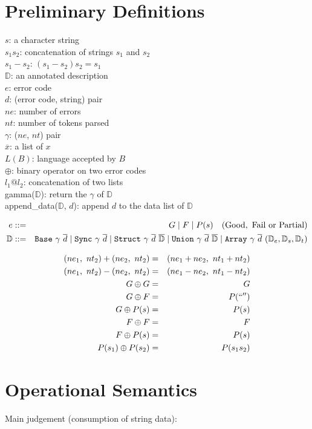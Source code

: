 \documentclass[11pt]{article}
\renewcommand{\bar}[1]{\overline #1}
\newcommand{\base}{{\tt Base}}
\newcommand{\sync}{{\tt Sync}}
\newcommand{\mystruct}{{\tt Struct}}
\newcommand{\myunion}{{\tt Union}}
\newcommand{\myarray}{{\tt Array}}
\newcommand{\D}{{\mathbb D}}
\begin{document}
\section{Preliminary Definitions}

\noindent
$s$: a character string \\
$s_1 s_2$: concatenation of strings $s_1$ and $s_2$\\
$s_1 - s_2$: $(s_1 - s_2) s_2 = s_1$ \\
$\D$: an annotated description \\
$e$: error code \\
$d$: (error code, string) pair\\
$ne$: number of errors \\
$nt$: number of tokens parsed\\
$\gamma$: ($ne$, $nt$) pair\\
$\bar x$: a list of $x$ \\
$L(B)$: language accepted by $B$\\
$\oplus$: binary operator on two error codes\\
$l_1 @ l_2$: concatenation of two lists\\
gamma($\D$): return the $\gamma$ of $\D$ \\
append\_data($\D$, $d$): append $d$ to the data list of $\D$

\begin{eqnarray*}
e &::=& G \bnfalt F \bnfalt P(s) ~~~ {\rm (Good,~ Fail~ or~ Partial)}\\
\D &::=& \base~ \gamma~ \bar{d} \bnfalt \sync~ \gamma~ \bar{d} \bnfalt 
\mystruct~ \gamma~ \bar{d}~ \bar{\D} 
\bnfalt \myunion~ \gamma~ \bar{d}~ \bar{\D} \bnfalt \myarray~ \gamma~ \bar{d}~ (\D_e, \D_s, \D_t)
\end{eqnarray*}

\begin{eqnarray*}
(ne_1,~ nt_2) + (ne_2,~ nt_2) &=& (ne_1 + ne_2,~ nt_1 + nt_2)\\
(ne_1,~ nt_2) - (ne_2,~ nt_2) &=& (ne_1 - ne_2,~ nt_1 - nt_2) \\
G \oplus G &=& G\\
G \oplus F &=& P(``'')\\
G \oplus P(s) &=& P(s)\\
F \oplus F &=& F\\
F \oplus P(s) &=& P(s)\\
P(s_1) \oplus P(s_2) &=& P(s_1 s_2)
\end{eqnarray*}

\section{Operational Semantics}
Main judgement (consumption of string data):
\end{document}
